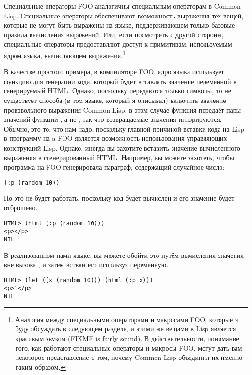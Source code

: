 Специальные операторы FOO аналогичны специальным операторам в Common Lisp. Специальные
операторы обеспечивают возможность выражения тех вещей, которые не могут быть выражены на
языке, поддерживающем только базовые правила вычисления выражений.  Или, если посмотреть с
другой стороны, специальные операторы предоставляют доступ к примитивам, используемым
ядром языка, вычисляющем выражения.\footnote{Аналогия между специальными операторами и
  макросами FOO, которые я буду обсуждать в следующем разделе, и этими же вещами в Lisp
  является красивым звуком (FIXME is fairly sound).  В действительности, понимание того,
  как работают специальные операторы и макросы FOO, могут дать вам некоторое представление
  о том, почему Common Lisp объединил их именно таким образом.}

В качестве простого примера, в компиляторе FOO, ядро языка использует функцию
 для генерации кода, который будет вставлять значение переменной в
генерируемый HTML.  Однако, поскольку  передаются только символы, то не
существует способа (в том языке, который я описывал) включить значение произвольного
выражения Common Lisp; в этом случае функция  передаёт пары значений функции
, а не , так что возвращаемые значения игнорируются.
Обычно, это то, что нам надо, поскольку главной причиной вставки кода на Lisp в программу
на a FOO является возможность использования управляющих конструкций Lisp.  Однако, иногда
вы захотите вставить значение вычисленного выражения в сгенерированный HTML.  Например, вы
можете захотеть, чтобы программа на FOO генерировала параграф, содержащий случайное число:

\begin{lstlisting}
(:p (random 10))
\end{lstlisting}

Но это не будет работать, поскольку код будет вычислен и его значение будет отброшено.

\begin{lstlisting}
HTML> (html (:p (random 10)))
<p></p>
NIL
\end{lstlisting}

В реализованном нами языке, вы можете обойти это путём вычисления значения вне вызова
, и затем вствки его используя переменную.

\begin{lstlisting}
HTML> (let ((x (random 10))) (html (:p x)))
<p>1</p>
NIL
\end{lstlisting}

